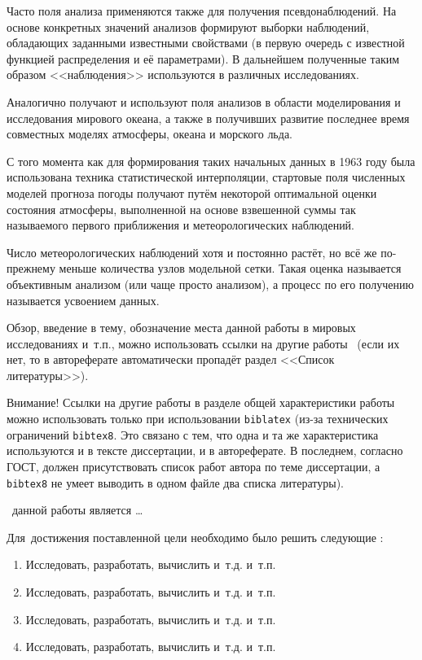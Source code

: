 Часто поля анализа применяются также для получения псевдонаблюдений. На основе конкретных значений анализов формируют выборки наблюдений, обладающих заданными известными свойствами (в первую очередь с известной функцией распределения и её параметрами). В дальнейшем полученные таким образом <<наблюдения>> используются в различных исследованиях.

Аналогично получают и используют поля анализов в области моделирования и исследования мирового океана, а также в получивших развитие последнее время совместных моделях атмосферы, океана и морского льда.

С того момента как для формирования таких начальных данных в 1963 году \cite{Gandin-1963} была использована техника статистической интерполяции, стартовые поля численных моделей прогноза погоды получают путём некоторой оптимальной оценки состояния атмосферы, выполненной на основе взвешенной суммы так называемого первого приближения и метеорологических наблюдений.


Число метеорологических наблюдений хотя и постоянно растёт, но всё же по-прежнему меньше количества узлов модельной сетки. Такая оценка называется объективным анализом (или чаще просто анализом), а процесс по его получению называется усвоением данных.

\newpage
Обзор, введение в тему, обозначение места данной работы в
мировых исследованиях и~т.\:п., можно использовать ссылки на другие
работы~ (если их нет, то в автореферате
автоматически пропадёт раздел <<Список литературы>>).

Внимание! Ссылки
на другие работы в разделе общей характеристики работы можно
использовать только при использовании \verb!biblatex! (из-за технических
ограничений \verb!bibtex8!. Это связано с тем, что одна и та же
характеристика используются и в тексте диссертации, и в
автореферате. В последнем, согласно ГОСТ, должен присутствовать список
работ автора по теме диссертации, а \verb!bibtex8! не умеет выводить в одном
файле два списка литературы).

 \aim\ данной работы является \ldots

Для~достижения поставленной цели необходимо было решить следующие {\tasks}:
\begin{enumerate}
  \item Исследовать, разработать, вычислить и~т.\:д. и~т.\:п.
  \item Исследовать, разработать, вычислить и~т.\:д. и~т.\:п.
  \item Исследовать, разработать, вычислить и~т.\:д. и~т.\:п.
  \item Исследовать, разработать, вычислить и~т.\:д. и~т.\:п.
\end{enumerate}

